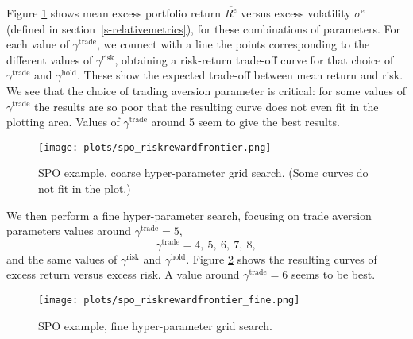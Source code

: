\documentclass[openany]{article}  %
\newcommand{\Rep}{R^\mathrm{e}}
\renewcommand{\S}{section~}
\begin{document}
Figure \ref{fig:spo-frontier} shows mean excess portfolio return $\overline{\Rep}$
versus excess volatility $\sigma^\mathrm{e}$
(defined in \S\ref{s-relativemetrics}),
for these combinations of parameters. For each
value of $\gamma^\text{trade}$, we connect with a line
the points corresponding to the different values of
$\gamma^\text{risk}$, obtaining a
risk-return trade-off curve for that choice of $\gamma^\text{trade}$
and $\gamma^\text{hold}$.
These show the expected trade-off between mean return and risk.
We see that the choice of trading aversion parameter is critical:
for some values of $\gamma^\text{trade}$ the results are so poor that
the resulting curve does not even fit in the plotting area.
Values of $\gamma^\text{trade}$ around 5
seem to give the best results.
\begin{figure}
\begin{center}
\texttt{[image: plots/spo\_riskrewardfrontier.png]}
\end{center}
\caption{SPO example, coarse hyper-parameter grid search.
(Some curves
do not fit in the plot.)
}
\label{fig:spo-frontier}
\end{figure}

We then perform a fine hyper-parameter search,
focusing on trade aversion parameters values around
$\gamma^\text{trade} = 5$,
\[
\gamma^\text{trade} =4,~ 5,~ 6,~ 7,~ 8,
\]
and the same values of $\gamma^\mathrm{risk}$ and $\gamma^\mathrm{hold}$.
Figure \ref{fig:spo-frontier-fine} shows the resulting curves of excess return
versus excess risk. A value around $\gamma^\text{trade}=6$ seems to be best.
\begin{figure}
\begin{center}
\texttt{[image: plots/spo\_riskrewardfrontier\_fine.png]}
\end{center}
\caption{SPO example, fine hyper-parameter grid search.
}
\label{fig:spo-frontier-fine}
\end{figure}
\end{document}
